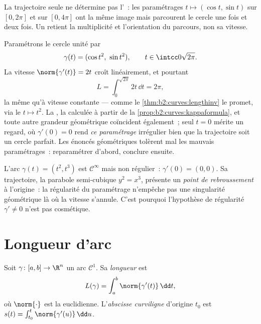 \begin{remark}
La trajectoire seule ne détermine pas l'~: les
paramétrages $t \mapsto (\cos t, \sin t)$ sur $[0, 2\pi]$ et sur
$[0, 4\pi]$ ont la même image mais parcourent le cercle une fois
et deux fois. Un  retient la multiplicité et
l'orientation du parcours, non sa vitesse.
\end{remark}

\begin{example}\label{ex:b2:curves:speedinvariance}
Paramétrons le cercle unité par
\[
\gamma(t) = (\cos t^2,\ \sin t^2),
\qquad t \in \intcc0{\sqrt{2\pi}} .
\]
La vitesse $\norm{\gamma'(t)} = 2t$ croît linéairement, et
pourtant
\[
L = \int_0^{\sqrt{2\pi}}2t\,\dd t = 2\pi ,
\]
la même  qu'à vitesse constante --- comme le
\cref{thm:b2:curves:lengthinv} le promet, via le  $t \mapsto t^2$. La , la 
calculée à partir de la \cref{prop:b2:curves:kappaformula}, et
toute autre grandeur géométrique coïncident également~; seul $t = 0$
mérite un regard, où $\gamma'(0) = 0$ rend \emph{ce
paramétrage} irrégulier bien que la trajectoire soit un
cercle parfait. Les énoncés géométriques tolèrent mal les
mauvais paramétrages~: reparamétrer d'abord, conclure
ensuite.
\end{example}

\begin{example}\label{ex:b2:curves:cusp}
L'arc $\gamma(t) = (t^2, t^3)$ est $\mathcal{C}^\infty$ mais non
régulier~: $\gamma'(0) = (0, 0)$. Sa trajectoire, la parabole
semi-cubique $y^2 = x^3$, présente un \emph{point de
rebroussement} à l'origine~: la régularité du paramétrage
n'empêche pas une singularité géométrique là où la vitesse
s'annule. C'est pourquoi l'hypothèse de régularité
$\gamma' \neq 0$ n'est pas cosmétique.
\end{example}

\section{Longueur d'arc}

\begin{definition}\label{def:b2:curves:length}
Soit $\gamma \colon [a, b] \to \R^n$ un arc $\mathcal{C}^1$. Sa
\emph{longueur} est
\[
L(\gamma) = \int_a^b \norm{\gamma'(t)}\, \dd t ,
\]
où $\norm{\cdot}$ est la  euclidienne. L'\emph{abscisse
curviligne} d'origine $t_0$ est $s(t) = \int_{t_0}^t
\norm{\gamma'(u)}\,\dd u$.
\end{definition}


